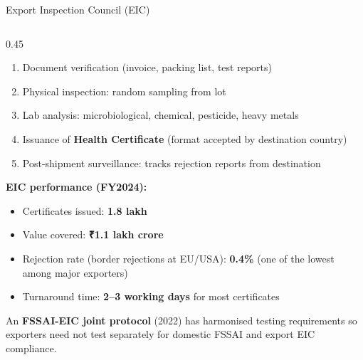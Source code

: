 \documentclass[
  ignorenonframetext,
  aspectratio=169,
]{beamer}
\providecommand{\tightlist}{%
  \setlength{\itemsep}{0pt}\setlength{\parskip}{0pt}}
\begin{document}
\begin{frame}{Export Inspection Council (EIC)}
\begin{columns}[T]
\begin{column}{0.45\linewidth}
\begin{enumerate}
\tightlist
\item
  Document verification (invoice, packing list, test reports)
\item
  Physical inspection: random sampling from lot
\item
  Lab analysis: microbiological, chemical, pesticide, heavy metals
\item
  Issuance of \textbf{Health Certificate} (format accepted by
  destination country)
\item
  Post-shipment surveillance: tracks rejection reports from destination
\end{enumerate}

\textbf{EIC performance (FY2024):}

\begin{itemize}
\tightlist
\item
  Certificates issued: \textbf{1.8 lakh}
\item
  Value covered: \textbf{₹1.1 lakh crore}
\item
  Rejection rate (border rejections at EU/USA): \textbf{0.4\%} (one of
  the lowest among major exporters)
\item
  Turnaround time: \textbf{2--3 working days} for most certificates
\end{itemize}

An \textbf{FSSAI-EIC joint protocol} (2022) has harmonised testing
requirements so exporters need not test separately for domestic FSSAI
and export EIC compliance.
\end{column}
\end{columns}
\end{frame}
\end{document}
